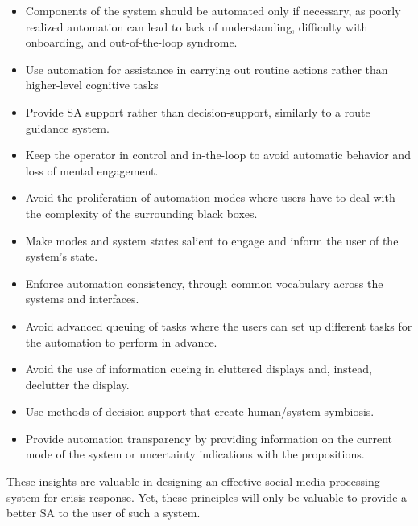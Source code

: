 \begin{itemize}
    \item Components of the system should be automated only if necessary, as poorly realized automation can lead to lack of understanding, difficulty with onboarding, and out-of-the-loop syndrome.
    \item Use automation for assistance in carrying out routine actions rather than higher-level cognitive tasks
    \item Provide SA support rather than decision-support, similarly to a route guidance system.
    \item Keep the operator in control and in-the-loop to avoid automatic behavior and loss of mental engagement.
    \item Avoid the proliferation of automation modes where users have to deal with the complexity of the surrounding black boxes.
    \item Make modes and system states salient to engage and inform the user of the system's state.
    \item Enforce automation consistency, through common vocabulary across the systems and interfaces.
    \item Avoid advanced queuing of tasks where the users can set up different tasks for the automation to perform in advance.
    \item Avoid the use of information cueing in cluttered displays and, instead, declutter the display.
    \item Use methods of decision support that create human/system symbiosis.
    \item Provide automation transparency by providing information on the current mode of the system or uncertainty indications with the propositions.
\end{itemize}

These insights are valuable in designing an effective social media processing system for crisis response.
Yet, these principles will only be valuable to provide a better SA to the user of such a system.


